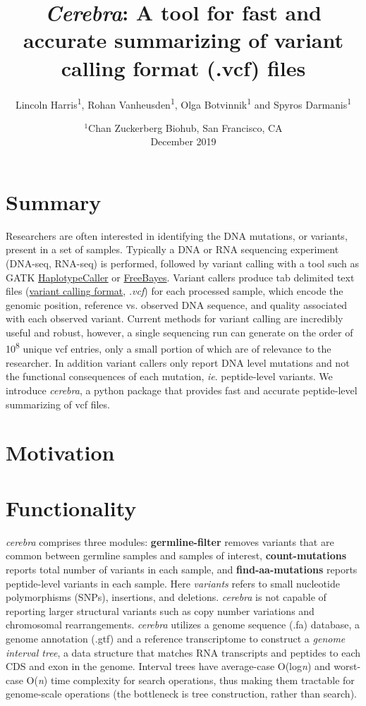 \documentclass{article}
\title{\emph{Cerebra}: A tool for fast and accurate summarizing of variant calling format (.vcf) files}
\author{Lincoln Harris\textsuperscript{1}, Rohan Vanheusden\textsuperscript{1}, Olga Botvinnik\textsuperscript{1} and Spyros Darmanis\textsuperscript{1}}
\date{%
    $^1$Chan Zuckerberg Biohub, San Francisco, CA\\%
    December 2019}
\begin{document}
\maketitle

\section*{Summary}
{Researchers are often interested in identifying the DNA mutations, or variants, present in a set of samples. Typically a DNA or RNA sequencing experiment (DNA-seq, RNA-seq) is performed, followed by variant calling with a tool such as GATK \href{https://software.broadinstitute.org/gatk/documentation/tooldocs/3.8-0/org_broadinstitute_gatk_tools_walkers_haplotypecaller_HaplotypeCaller.php}{HaplotypeCaller} or  \href{https://github.com/ekg/freebayes}{FreeBayes}. Variant callers produce tab delimited text files (\href{https://samtools.github.io/hts-specs/VCFv4.2.pdf}{variant calling format}, \emph{.vcf}) for each processed sample, which encode the genomic position, reference vs. observed DNA sequence, and quality associated with each observed variant. Current methods for variant calling are incredibly useful and robust, however, a single sequencing run can generate on the order of 10\textsuperscript{8} unique vcf entries, only a small portion of which are of relevance to the researcher. In addition variant callers only report DNA level mutations and not the functional consequences of each mutation, \emph{ie}. peptide-level variants. We introduce \emph{cerebra}, a python package that provides fast and accurate peptide-level summarizing of vcf files.}

\section*{Motivation}
\section*{Functionality}
{\emph{cerebra} comprises three modules: \textbf{germline-filter} removes variants that are common between germline samples and samples of interest, \textbf{count-mutations} reports total number of variants in each sample, and \textbf{find-aa-mutations} reports peptide-level variants in each sample. Here \emph{variants} refers to small nucleotide polymorphisms (SNPs), insertions, and deletions. \emph{cerebra} is not capable of reporting larger structural variants such as copy number variations and chromosomal rearrangements. \emph{cerebra} utilizes a genome sequence (.fa) database, a genome annotation (.gtf) and a reference transcriptome to construct a \emph{genome interval tree}, a data structure that matches RNA transcripts and peptides to each CDS and exon in the genome. Interval trees have average-case O(log\emph{n}) and worst-case O(\emph{n}) time complexity for search operations, thus making them tractable for genome-scale operations (the bottleneck is tree construction, rather than search). }
\end{document}
